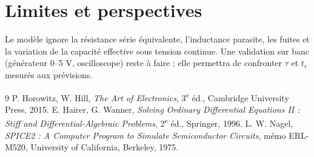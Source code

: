 \documentclass[a4paper,11pt]{article}
\begin{document}
\section{Limites et perspectives}
Le modèle ignore la résistance série équivalente, l'inductance parasite, les fuites et la variation de la capacité effective sous tension continue. Une validation sur banc (générateur 0--5 V, oscilloscope) reste à faire ; elle permettra de confronter $\tau$ et $t_r$ mesurés aux prévisions.

\begin{thebibliography}{9}
 P. Horowitz, W. Hill, \emph{The Art of Electronics}, 3\textsuperscript{e} éd., Cambridge University Press, 2015.
 E. Hairer, G. Wanner, \emph{Solving Ordinary Differential Equations II : Stiff and Differential-Algebraic Problems}, 2\textsuperscript{e} éd., Springer, 1996.
 L. W. Nagel, \emph{SPICE2 : A Computer Program to Simulate Semiconductor Circuits}, mémo ERL-M520, University of California, Berkeley, 1975.
\end{thebibliography}
\end{document}
